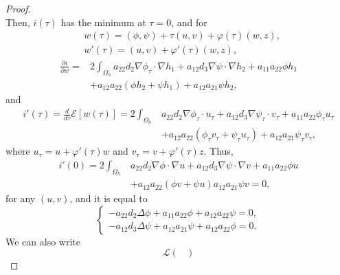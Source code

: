 \documentclass[11pt]{amsart}
\numberwithin{equation}{section}
\theoremstyle{plain}
\theoremstyle{definition}
\begin{document}
\begin{proof}
\begin{equation*}
	\end{equation*}
	Then, $i(\tau)$ has the minimum at $\tau=0$, and for
	\begin{equation*}
		\begin{aligned}
			&w(\tau)=(\phi,\psi)+\tau(u,v)+\varphi(\tau)(w,z),\\
			&w'(\tau)=(u,v)+\varphi'(\tau)(w,z),
		\end{aligned}
	\end{equation*}
	\begin{equation*}
	\begin{aligned}
		\frac{\partial i}{\partial w}=&2\int_{\Omega_h}a_{22}d_2\nabla \phi_\tau \cdot \nabla h_1 +a_{12}d_3 \nabla \psi \cdot \nabla h_2 + a_{11}a_{22}\phi h_1\\
		&+a_{12}a_{22}(\phi h_2+\psi h_1)+a_{12}a_{21}\psi h_2,
	\end{aligned}
	\end{equation*}
	and
	\begin{equation*}
	\begin{aligned}
		i'(\tau)=\frac{d}{d\tau}\mathcal{E}[w(\tau)]=2\int_{\Omega_h}&a_{22}d_2\nabla \phi_\tau \cdot u_\tau + a_{12}d_3\nabla \psi_\tau \cdot v_\tau +a_{11}a_{22}\phi_\tau u_\tau \\
		&+a_{12}a_{22}(\phi_\tau v_\tau+\psi_\tau u_\tau)+a_{12}a_{21}\psi _\tau v_\tau,
	\end{aligned}
	\end{equation*}
	where $u_\tau=u+\varphi'(\tau)w$ and $v_\tau=v+\varphi'(\tau)z$.
	Thus,
	\begin{equation*}
	\begin{aligned}
		i'(0)=2\int_{\Omega_h}&a_{22}d_2\nabla \phi \cdot \nabla u+a_{12}d_3 \nabla \psi \cdot \nabla v+a_{11}a_{22}\phi u\\
		&+a_{12}a_{22}(\phi v+\psi u)a_{12}a_{21}\psi v =0,
	\end{aligned}
	\end{equation*}
	for any $(u,v)$, and it is equal to
	\begin{equation*}
		\left \{ \begin{aligned}
			-a_{22}d_2\Delta \phi +a_{11}a_{22}\phi +a_{12}a_{22}\psi =0,\\
			-a_{12}d_3\Delta \psi +a_{12}a_{21}\psi +a_{12}a_{22}\phi =0.
		\end{aligned} \right.
	\end{equation*}
	We can also write
	\begin{equation*}
		\mathcal{L}\begin{pmatrix}

\end{pmatrix}
\end{equation*}
\end{proof}
\end{document}
